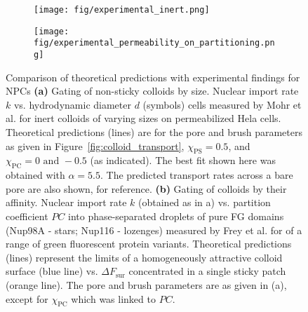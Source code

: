 \documentclass[12pt, a4paper]{article}
\begin{document}
\begin{figure}
    \centering
    \begin{subfigure}[b]{0.45\textwidth}
        \texttt{[image: fig/experimental\_inert.png]}
    \end{subfigure}
    \begin{subfigure}[b]{0.45\textwidth}
        \texttt{[image: fig/experimental\_permeability\_on\_partitioning.png]}
    \end{subfigure}
    \caption{
    Comparison of theoretical predictions with experimental findings for NPCs
    \textbf{(a)} 
    Gating of non-sticky colloids by size.
    Nuclear import rate $k$ vs. hydrodynamic diameter $d$ (symbols) cells measured by Mohr et al. for inert colloids of varying sizes on permeabilized Hela cells.
    Theoretical predictions (lines) are for the pore and brush parameters as given in Figure~\ref{fig:colloid_transport}, $\chi_{\text{PS}} = 0.5$, and $\chi_{\text{PC}} = 0 \text{ and } -0.5$ (as indicated).
    The best fit shown here was obtained with $\alpha = 5.5$.
    The predicted transport rates across a bare pore are also shown, for reference.
    \textbf{(b)} 
    Gating of colloids by their affinity.
    Nuclear import rate $k$ (obtained as in a) vs. partition coefficient $PC$ into phase-separated droplets of pure FG domains (Nup98A - stars; Nup116 - lozenges) measured by Frey et al. for of a range of green fluorescent protein variants.
    Theoretical predictions (lines) represent the limits of a homogeneously attractive colloid surface (blue line) vs. $\Delta F_\text{sur}$ concentrated in a single sticky patch (orange line).
    The pore and brush parameters are as given in (a), except for $\chi_\text{PC}$ which was linked to $PC$.
    }
    \label{fig:NPC_comparison}
\end{figure}
\end{document}

